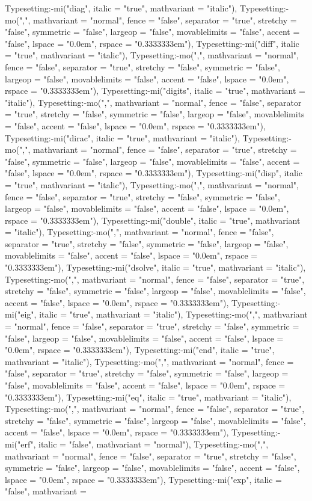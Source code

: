 \documentclass{article}
\begin{document}
{{{\begin{maplegroup}
\begin{maplelatex}
Typesetting:-mi("diag", italic = "true", mathvariant = "italic"), Typesetting:-mo(",", mathvariant = "normal", fence = "false", separator = "true", stretchy = "false", symmetric = "false", largeop = "false", movablelimits = "false", accent = "false", lspace = "0.0em", rspace = "0.3333333em"), Typesetting:-mi("diff", italic = "true", mathvariant = "italic"), Typesetting:-mo(",", mathvariant = "normal", fence = "false", separator = "true", stretchy = "false", symmetric = "false", largeop = "false", movablelimits = "false", accent = "false", lspace = "0.0em", rspace = "0.3333333em"), Typesetting:-mi("digits", italic = "true", mathvariant = "italic"), Typesetting:-mo(",", mathvariant = "normal", fence = "false", separator = "true", stretchy = "false", symmetric = "false", largeop = "false", movablelimits = "false", accent = "false", lspace = "0.0em", rspace = "0.3333333em"), Typesetting:-mi("dirac", italic = "true", mathvariant = "italic"), Typesetting:-mo(",", mathvariant = "normal", fence = "false", separator = "true", stretchy = "false", symmetric = "false", largeop = "false", movablelimits = "false", accent = "false", lspace = "0.0em", rspace = "0.3333333em"), Typesetting:-mi("disp", italic = "true", mathvariant = "italic"), Typesetting:-mo(",", mathvariant = "normal", fence = "false", separator = "true", stretchy = "false", symmetric = "false", largeop = "false", movablelimits = "false", accent = "false", lspace = "0.0em", rspace = "0.3333333em"), Typesetting:-mi("double", italic = "true", mathvariant = "italic"), Typesetting:-mo(",", mathvariant = "normal", fence = "false", separator = "true", stretchy = "false", symmetric = "false", largeop = "false", movablelimits = "false", accent = "false", lspace = "0.0em", rspace = "0.3333333em"), Typesetting:-mi("dsolve", italic = "true", mathvariant = "italic"), Typesetting:-mo(",", mathvariant = "normal", fence = "false", separator = "true", stretchy = "false", symmetric = "false", largeop = "false", movablelimits = "false", accent = "false", lspace = "0.0em", rspace = "0.3333333em"), Typesetting:-mi("eig", italic = "true", mathvariant = "italic"), Typesetting:-mo(",", mathvariant = "normal", fence = "false", separator = "true", stretchy = "false", symmetric = "false", largeop = "false", movablelimits = "false", accent = "false", lspace = "0.0em", rspace = "0.3333333em"), Typesetting:-mi("end", italic = "true", mathvariant = "italic"), Typesetting:-mo(",", mathvariant = "normal", fence = "false", separator = "true", stretchy = "false", symmetric = "false", largeop = "false", movablelimits = "false", accent = "false", lspace = "0.0em", rspace = "0.3333333em"), Typesetting:-mi("eq", italic = "true", mathvariant = "italic"), Typesetting:-mo(",", mathvariant = "normal", fence = "false", separator = "true", stretchy = "false", symmetric = "false", largeop = "false", movablelimits = "false", accent = "false", lspace = "0.0em", rspace = "0.3333333em"), Typesetting:-mi("erf", italic = "false", mathvariant = "normal"), Typesetting:-mo(",", mathvariant = "normal", fence = "false", separator = "true", stretchy = "false", symmetric = "false", largeop = "false", movablelimits = "false", accent = "false", lspace = "0.0em", rspace = "0.3333333em"), Typesetting:-mi("exp", italic = "false", mathvariant = 
\end{maplelatex}
\end{maplegroup}}}}
\end{document}
